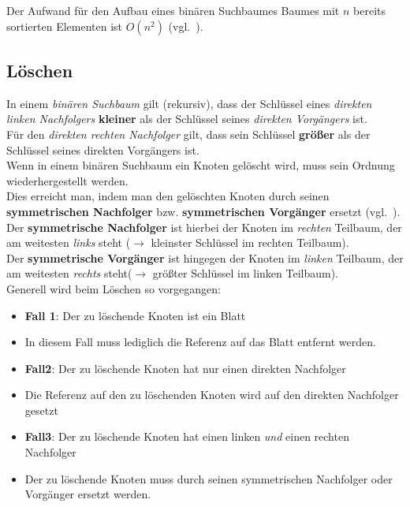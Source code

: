 \noindent
Der Aufwand für den Aufbau eines binären Suchbaumes Baumes mit $n$ bereits sortierten Elementen ist $O(n^2)$ (vgl.~\cite[235 f.]{GD18d}).


\subsection{Löschen}

In einem \textit{binären Suchbaum} gilt (rekursiv), dass der Schlüssel eines \textit{direkten linken Nachfolgers} \textbf{kleiner} als der Schlüssel seines \textit{direkten Vorgängers} ist.\\
Für den \textit{direkten rechten Nachfolger} gilt, dass sein Schlüssel \textbf{größer} als der Schlüssel seines direkten Vorgängers ist.\\

\noindent
Wenn in einem binären Suchbaum ein Knoten gelöscht wird, muss sein Ordnung wiederhergestellt werden.\\

\noindent
Dies erreicht man, indem man den gelöschten Knoten durch seinen \textbf{symmetrischen Nachfolger} bzw. \textbf{symmetrischen Vorgänger} ersetzt (vgl.~\cite[269, 272]{OW17e}).\\
Der \textbf{symmetrische Nachfolger} ist hierbei der Knoten im \textit{rechten} Teilbaum, der am weitesten \textit{links} steht ($\rightarrow$ kleinster Schlüssel im rechten Teilbaum).\\
Der \textbf{symmetrische Vorgänger} ist hingegen der Knoten im \textit{linken} Teilbaum,  der am weitesten \textit{rechts} steht($\rightarrow$ größter Schlüssel im linken Teilbaum).\\

\noindent
Generell wird beim Löschen so vorgegangen:

\begin{itemize}
    \item \textbf{Fall 1}: Der zu löschende Knoten ist ein Blatt
    \item [] In diesem Fall muss lediglich die Referenz auf das Blatt entfernt werden.
    \item \textbf{Fall2}: Der zu löschende Knoten hat nur einen direkten Nachfolger
    \item[] Die Referenz auf den zu löschenden Knoten wird auf den direkten Nachfolger gesetzt
    \item \textbf{Fall3}: Der zu löschende Knoten hat einen linken \textit{und} einen rechten Nachfolger
    \item[] Der zu löschende Knoten muss durch seinen symmetrischen Nachfolger oder Vorgänger ersetzt werden.
\end{itemize}\\


